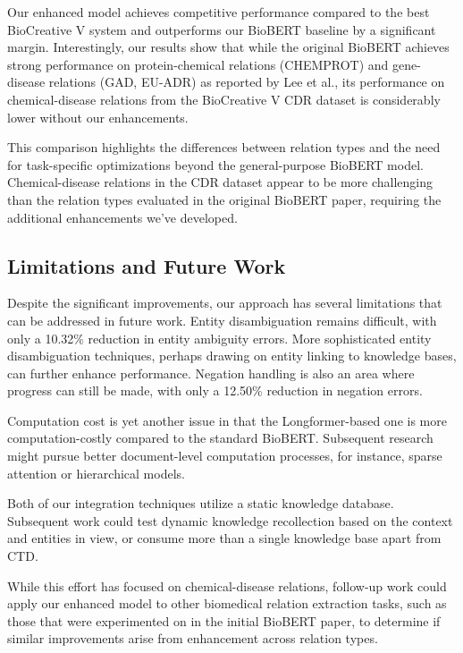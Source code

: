 \documentclass{amia}
\begin{document}
Our enhanced model achieves competitive performance compared to the best BioCreative V system and outperforms our BioBERT baseline by a significant margin. Interestingly, our results show that while the original BioBERT achieves strong performance on protein-chemical relations (CHEMPROT) and gene-disease relations (GAD, EU-ADR) as reported by Lee et al., its performance on chemical-disease relations from the BioCreative V CDR dataset is considerably lower without our enhancements.

This comparison highlights the differences between relation types and the need for task-specific optimizations beyond the general-purpose BioBERT model. Chemical-disease relations in the CDR dataset appear to be more challenging than the relation types evaluated in the original BioBERT paper, requiring the additional enhancements we've developed.

\subsection*{Limitations and Future Work}

Despite the significant improvements, our approach has several limitations that can be addressed in future work. Entity disambiguation remains difficult, with only a 10.32\% reduction in entity ambiguity errors. More sophisticated entity disambiguation techniques, perhaps drawing on entity linking to knowledge bases, can further enhance performance. Negation handling is also an area where progress can still be made, with only a 12.50\% reduction in negation errors.

Computation cost is yet another issue in that the Longformer-based one is more computation-costly compared to the standard BioBERT. Subsequent research might pursue better document-level computation processes, for instance, sparse attention or hierarchical models.

Both of our integration techniques utilize a static knowledge database. Subsequent work could test dynamic knowledge recollection based on the context and entities in view, or consume more than a single knowledge base apart from CTD.

While this effort has focused on chemical-disease relations, follow-up work could apply our enhanced model to other biomedical relation extraction tasks, such as those that were experimented on in the initial BioBERT paper, to determine if similar improvements arise from enhancement across relation types.
\end{document}
